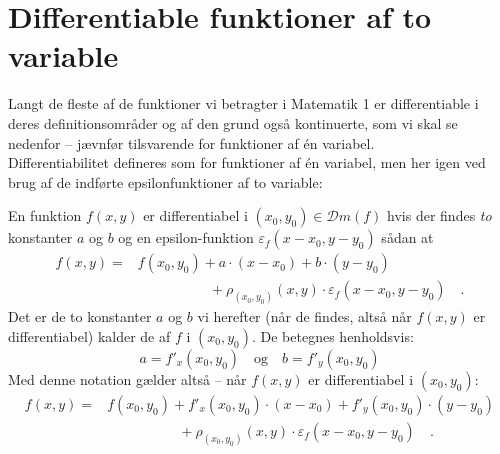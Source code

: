 \section{Differentiable funktioner af to variable} \label{Epsilon}
Langt de fleste af de funktioner vi betragter i Matematik 1 er differentiable i deres definitionsområder og af den grund også kontinuerte, som vi skal se nedenfor -- jævnfør tilsvarende for funktioner af \'{e}n variabel. \\

Differentiabilitet defineres som for funktioner af \'{e}n variabel, men her igen ved brug af de indførte epsilonfunktioner af to variable:

\begin{definition}
En funktion $f(x,y)$ er differentiabel i $(x_{0}, y_{0}) \in \mathcal{D}m(f)$ hvis der findes \emph{to} konstanter $a$ og $b$ og en
epsilon-funktion $\varepsilon_{f}(x-x_{0},y-y_{0})$ sådan at
\begin{equation}
\begin{aligned}
f(x,y) = &f(x_{0}, y_{0}) + a\cdot (x-x_{0}) + b\cdot (y-y_{0}) \\
&\phantom{f(x,y) =}+ \rho_{(x_{0}, y_{0})}(x,y) \cdot \varepsilon_{f}(x-x_{0},y-y_{0}) \quad .
\end{aligned}
\end{equation}
Det er de to konstanter $a$ og $b$ vi herefter (når de findes, altså når $f(x,y)$ er differentiabel) kalder de  af $f$ i $(x_{0}, y_{0})$. De betegnes henholdsvis:
\begin{equation}
a = f'_{x}(x_{0}, y_{0}) \quad \textrm{og} \quad b = f'_{y}(x_{0}, y_{0})
\end{equation}
Med denne notation gælder altså -- når $f(x,y)$ er differentiabel i $(x_{0}, y_{0})$:
\begin{equation} \label{eqDifferentiabel}
\begin{aligned}
f(x,y) = &f(x_{0}, y_{0}) + f'_{x}(x_{0}, y_{0})\cdot (x-x_{0}) + f'_{y}(x_{0}, y_{0})\cdot (y-y_{0}) \\
&\phantom{f(x,y) =}+ \rho_{(x_{0}, y_{0})}(x,y) \cdot \varepsilon_{f}(x-x_{0},y-y_{0}) \quad .
\end{aligned}
\end{equation}
\end{definition}


